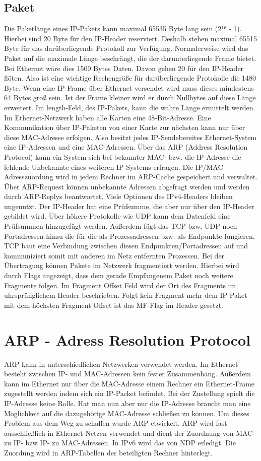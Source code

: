 \subsection{Paket}
Die Paketlänge eines IP-Pakets kann maximal 65535 Byte lang sein (2¹⁶ - 1). 
Hierbei sind 20 Byte für den IP-Header reserviert.
Deshalb stehen maximal 65515 Byte für das darüberliegende Protokoll zur Verfügung.
Normalerweise wird das Paket auf die maximale Länge beschrängt, die der darunterliegende Frame bietet. 
Bei Ethernet wäre dies 1500 Bytes Daten.
Davon gehen 20 für den IP-Header flöten.
Also ist eine wichtige Rechengröße für darüberliegende Protokolle die 1480 Byte.
Wenn eine IP-Frame über Ethernet versendet wird muss dieses mindestens 64 Bytes groß sein. 
Ist der Frame kleiner wird er durch Nullbytes auf diese Länge erweitert.
Im length-Feld, des IP-Pakets, kann die wahre Länge ermittelt werden.
Im Ethernet-Netzwerk haben alle Karten eine 48-Bit-Adresse. 
Eine Kommunikation über IP-Paketen von einer Karte zur nächsten kann nur über diese MAC-Adresse erfolgen.
Also besitzt jedes IP-Sendebereites Ethernet-System eine IP-Adressen und eine MAC-Adressen.
Über das ARP (Address Resolution Protocol) kann ein System sich bei bekannter MAC- bzw. die IP-Adresse die fehlende Unbekannte eines weiteren IP-Systems erfragen.
Die IP/MAC-Adresszuordung wird in jedem Rechner im ARP-Cache gespeichert und verwaltet.
Über ARP-Request können unbekannte Adressen abgefragt werden und werden durch ARP-Replys beantwortet.
Viele Optionen des IPv4-Headers bleiben ungenutzt. 
Der IP-Header hat eine Prüfsumme, die aber nur über den IP-Header gebildet wird. Über höhere Protokolle wie UDP kann dem Datenfeld eine Prüfsummen hinzugefügt werden. 
Außerdem fügt das TCP bzw. UDP noch Portadressen hinzu die für die als Prozessadressen bzw. als Endpunkte fungieren.
TCP baut eine Verbindung zwischen diesen Endpunkten/Portadressen auf und kommuniziert somit mit anderen im Netz entfernten Prozessen.
Bei der Übertragung können Pakete im Netzwerk fragmentiert werden.
Hierbei wird durch Flags angezeigt, dass dem gerade Empfangenem Paket noch weitere Fragmente folgen.
Im Fragment Offset Feld wird der Ort des Fragments im uhrsprünglichem Header beschrieben.
Folgt kein Fragment mehr dem IP-Paket mit dem höchsten Fragment Offset ist das MF-Flag im Header gesetzt.

\section{ARP - Adress Resolution Protocol }
ARP kann in unterschiedlichen Netzwerken verwendet werden.
Im Ethernet besteht zwischen IP- und MAC-Adressen kein fester Zusammenhang.
Außerdem kann im Ethernet nur über die MAC-Adresse einem Rechner ein Ethernet-Frame zugestellt werden indem sich ein IP-Packet befindet. 
Bei der Zustellung spielt die IP-Adresse keine Rolle.
Hat man nun aber nur die IP-Adresse braucht man eine Möglichkeit auf die dazugehörige MAC-Adresse schließen zu können.  
Um dieses Problem aus dem Weg zu schaffen wurde ARP etwickelt.
ARP wird fast ausschließlich in Ethernet-Netzen verwendet und dient der Zuordnung von MAC- zu IP- bzw IP- zu MAC-Adressen.
In IPv6 wird das von NDP erledigt.
Die Zuordung wird in ARP-Tabellen der beteiligten Rechner hinterlegt.
 
